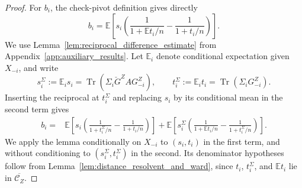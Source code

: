 \documentclass[EJP, preprint, NODS, nobera, nofontexpansion]{ejpecp}
\DeclareMathOperator{\tr}{Tr}
\begin{document}
\begin{proof}
For $b_i$, the check-pivot definition gives directly
\[
 b_i
 =\mathbb E\left[s_i\left(
   \frac1{1+\mathbb Et_i/n}-\frac1{1+t_i/n}
 \right)\right].
\]
We use Lemma~\ref{lem:reciprocal_difference_estimate} from
Appendix~\ref{app:auxiliary_results}. Let $\mathbb E_i$ denote
conditional expectation given $X_{-i}$, and write
\[
 s_i^\Sigma:=\mathbb E_i s_i=\tr(\Sigma_i\check G^Z A G_{-i}^Z),
 \qquad
 t_i^\Sigma:=\mathbb E_i t_i=\tr(\Sigma_iG_{-i}^Z).
\]
Inserting the reciprocal at $t_i^\Sigma$ and replacing $s_i$ by its
conditional mean in the second term gives
\begin{align}\label{eq:hs_two_level_schur_decomposition}
 b_i
 ={}&\mathbb E\left[s_i\left(
       \frac1{1+t_i^\Sigma/n}-\frac1{1+t_i/n}
     \right)\right]
     +\mathbb E\left[s_i^\Sigma\left(
       \frac1{1+\mathbb Et_i/n}-\frac1{1+t_i^\Sigma/n}
     \right)\right].
\end{align}
We apply the lemma conditionally on \(X_{-i}\) to \((s_i,t_i)\)
in the first term, and without conditioning to
\((s_i^\Sigma,t_i^\Sigma)\) in the second. Its denominator hypotheses follow
from Lemma~\ref{lem:distance_resolvent_and_ward}, since $t_i$, $t_i^\Sigma$,
and $\mathbb Et_i$ lie in $\overline{\mathcal C_Z}$.


\end{proof}
\end{document}
